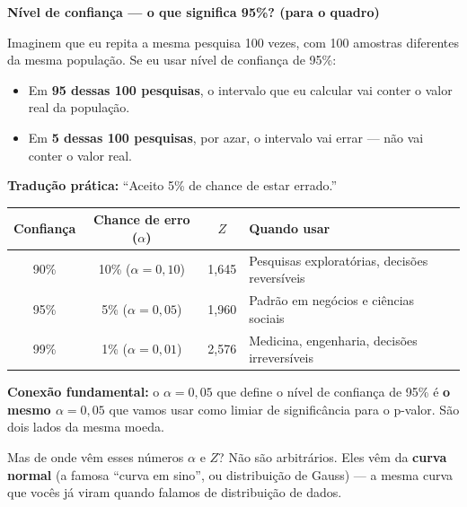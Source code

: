 \begin{BoardBox}
\textbf{Nível de confiança — o que significa 95\%? (para o quadro)}

Imaginem que eu repita a mesma pesquisa 100 vezes, com 100 amostras
diferentes da mesma população. Se eu usar nível de confiança de 95\%:

\begin{itemize}
  \item Em \textbf{95 dessas 100 pesquisas}, o intervalo que eu calcular
  vai conter o valor real da população.
  \item Em \textbf{5 dessas 100 pesquisas}, por azar, o intervalo vai
  errar — não vai conter o valor real.
\end{itemize}

\textbf{Tradução prática:} ``Aceito 5\% de chance de estar errado.''

\medskip
\begin{tabular}{|c|c|c|l|}
\hline
\textbf{Confiança} & \textbf{Chance de erro ($\alpha$)} & \textbf{$Z$} & \textbf{Quando usar} \\
\hline
90\% & 10\% ($\alpha = 0{,}10$) & 1,645 & Pesquisas exploratórias, decisões reversíveis \\
95\% & 5\% ($\alpha = 0{,}05$) & 1,960 & Padrão em negócios e ciências sociais \\
99\% & 1\% ($\alpha = 0{,}01$) & 2,576 & Medicina, engenharia, decisões irreversíveis \\
\hline
\end{tabular}

\medskip
\textbf{Conexão fundamental:} o $\alpha = 0{,}05$ que define o nível de
confiança de 95\% é \textbf{o mesmo $\alpha = 0{,}05$} que vamos usar como
limiar de significância para o p-valor. São dois lados da mesma moeda.
\end{BoardBox}

Mas de onde vêm esses números $\alpha$ e $Z$? Não são arbitrários.
Eles vêm da \textbf{curva normal} (a famosa ``curva em sino'', ou
distribuição de Gauss) --- a mesma curva que vocês já viram quando
falamos de distribuição de dados.

